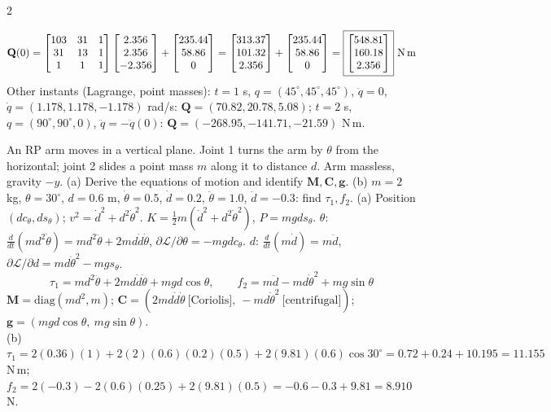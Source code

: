 \begin{multicols}{2}
\begin{examq}
\[\mathbf Q(0)=\begin{bmatrix}103&31&1\\31&13&1\\1&1&1\end{bmatrix}\begin{bmatrix}2.356\\2.356\\-2.356\end{bmatrix}+\begin{bmatrix}235.44\\58.86\\0\end{bmatrix}=\begin{bmatrix}313.37\\101.32\\2.356\end{bmatrix}+\begin{bmatrix}235.44\\58.86\\0\end{bmatrix}=\boxed{\begin{bmatrix}548.81\\160.18\\2.356\end{bmatrix}}\text{ N\,m}\]
Other instants (Lagrange, point masses): $t=1$ s, $q=(45^\circ,45^\circ,45^\circ)$, $\ddot q=0$, $\dot q=(1.178,1.178,-1.178)$ rad/s: $\mathbf Q=(70.82,20.78,5.08)$; $t=2$ s, $q=(90^\circ,90^\circ,0)$, $\ddot q=-\ddot q(0)$: $\mathbf Q=(-268.95,-141.71,-21.59)$ N\,m. \chk
\end{examq}

\begin{examq}
An RP arm moves in a vertical plane. Joint 1 turns the arm by $\theta$ from the horizontal; joint 2 slides a point mass $m$ along it to distance $d$. Arm massless, gravity $-y$. (a) Derive the equations of motion and identify $\mathbf M,\mathbf C,\mathbf g$. (b) $m=2$ kg, $\theta=30^\circ$, $d=0.6$ m, $\dot\theta=0.5$, $\dot d=0.2$, $\ddot\theta=1.0$, $\ddot d=-0.3$: find $\tau_1,f_2$.
\solution
(a) Position $(dc_\theta,ds_\theta)$; $v^2=\dot d^2+d^2\dot\theta^2$. $K=\tfrac12m(\dot d^2+d^2\dot\theta^2)$, $P=mgds_\theta$. $\theta$: $\frac d{dt}(md^2\dot\theta)=md^2\ddot\theta+2md\dot d\dot\theta$, $\partial\mathcal L/\partial\theta=-mgdc_\theta$. $d$: $\frac d{dt}(m\dot d)=m\ddot d$, $\partial\mathcal L/\partial d=md\dot\theta^2-mgs_\theta$.
\[\tau_1=md^2\ddot\theta+2md\dot d\dot\theta+mgd\cos\theta,\qquad f_2=m\ddot d-md\dot\theta^2+mg\sin\theta\]
$\mathbf M=\mathrm{diag}(md^2,m)$; $\mathbf C=(2md\dot d\dot\theta\ \text{[Coriolis]},\ -md\dot\theta^2\ \text{[centrifugal]})$; $\mathbf g=(mgd\cos\theta,\ mg\sin\theta)$.\\
(b) $\tau_1=2(0.36)(1)+2(2)(0.6)(0.2)(0.5)+2(9.81)(0.6)\cos30^\circ=0.72+0.24+10.195=\boxed{11.155}$ N\,m; $f_2=2(-0.3)-2(0.6)(0.25)+2(9.81)(0.5)=-0.6-0.3+9.81=\boxed{8.910}$ N. \chk
\end{examq}


\end{multicols}
